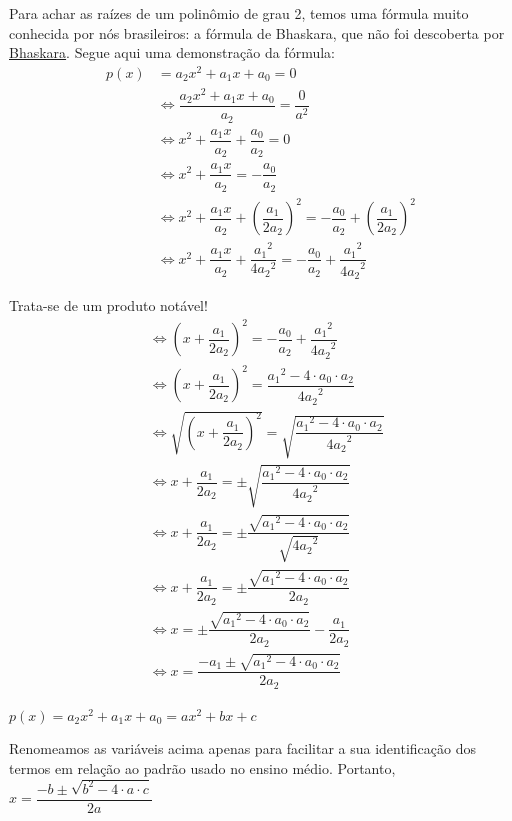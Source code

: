 \documentclass[
  letterpaper,
  DIV=11,
  numbers=noendperiod]{scrreprt}
\begin{document}
Para achar as raízes de um polinômio de grau 2, temos uma fórmula muito
conhecida por nós brasileiros: a fórmula de Bhaskara, que não foi
descoberta por
\href{https://pt.wikipedia.org/wiki/F\%C3\%B3rmula_quadr\%C3\%A1tica\#Desenvolvimento_hist\%C3\%B3rico}{Bhaskara}.
Segue aqui uma demonstração da fórmula: \[
\begin{aligned}
    p(x) &= a_2x^2+a_1x+a_0 = 0 \\
    &\Leftrightarrow \dfrac{a_2x^2+a_1x+a_0}{a_2} = \dfrac{0}{a^2} \\
    &\Leftrightarrow x^2 + \dfrac{a_1x}{a_2} + \dfrac{a_0}{a_2} = 0 \\
    &\Leftrightarrow x^2 + \dfrac{a_1x}{a_2} = - \dfrac{a_0}{a_2} \\
    &\Leftrightarrow x^2 + \dfrac{a_1x}{a_2} + \left(\dfrac{a_1}{2a_2}\right)^2 = - \dfrac{a_0}{a_2}+\left(\dfrac{a_1}{2a_2}\right)^2 \\
    &\Leftrightarrow x^2 + \dfrac{a_1x}{a_2} + \dfrac{{a_1}^2}{4{a_2}^2} = - \dfrac{a_0}{a_2}+\dfrac{{a_1}^2}{{4a_2}^2}
\end{aligned}
\]

Trata-se de um produto notável! \[
\begin{aligned}
    &\Leftrightarrow  \left(x+\dfrac{a_1}{2a_2}\right)^2 = - \dfrac{a_0}{a_2}+\dfrac{{a_1}^2}{{4a_2}^2} \\
    &\Leftrightarrow  \left(x+\dfrac{a_1}{2a_2}\right)^2 = \dfrac{{a_1}^2-4 \cdot a_0 \cdot a_2}{{4a_2}^2} \\
    &\Leftrightarrow  \sqrt{\left(x+\dfrac{a_1}{2a_2}\right)^2}=\sqrt{ \dfrac{{a_1}^2-4 \cdot a_0 \cdot a_2}{{4a_2}^2}} \\
    &\Leftrightarrow  x+\dfrac{a_1}{2a_2} = \pm \sqrt{ \dfrac{{a_1}^2-4 \cdot a_0 \cdot a_2}{{4a_2}^2}} \\
    &\Leftrightarrow  x+\dfrac{a_1}{2a_2} = \pm { \dfrac{\sqrt{{a_1}^2-4 \cdot a_0 \cdot a_2}}{\sqrt{{4a_2}^2}}} \\
    &\Leftrightarrow  x+\dfrac{a_1}{2a_2} = \pm { \dfrac{\sqrt{{a_1}^2-4 \cdot a_0 \cdot a_2}}{2a_2}} \\
    &\Leftrightarrow  x = \pm { \dfrac{\sqrt{{a_1}^2-4 \cdot a_0 \cdot a_2}}{2a_2}}-\dfrac{a_1}{2a_2} \\
    &\Leftrightarrow  x = { \dfrac{-a_1 \pm\sqrt{{a_1}^2-4 \cdot a_0 \cdot a_2}}{2a_2}}
\end{aligned}
\]

\(p(x) = a_2x^2+a_1x+a_0 = ax^2+bx+c\)

Renomeamos as variáveis acima apenas para facilitar a sua identificação
dos termos em relação ao padrão usado no ensino médio. Portanto,
\(x = \dfrac{-b \pm \sqrt{b^2-4 \cdot a \cdot c }}{2a}\)
\end{document}
